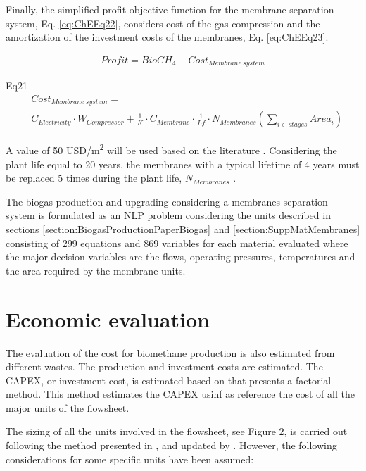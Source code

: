 \begin{refsection}[referencesCh7]
Finally, the simplified profit objective function for the membrane separation system, Eq. \ref{eq:ChEEq22}, considers cost of the gas compression and the amortization of the investment costs of the membranes, Eq. \ref{eq:ChEEq23}. 

\begin{align}
Profit = BioCH_{4} - Cost_{{{Membrane \ system}}} \label{eq:ChEEq22}
\end{align}

Eq21
\begin{align}
& Cost_{{{Membrane \ system}}} = \nonumber \\
& {{{C}}_{Electricity}}\cdot W_{Compressor} + \frac{1}{K}\cdot{C_{Membrane}}\cdot\frac{1}{{Lf}}\cdot{N_{Membranes}}(\sum\limits_{i \in stages} {Are{a_i}} ) \label{eq:ChEEq23}
\end{align}

A value of 50 USD/m\textsuperscript{2} will be used based on the literature \citep{kim2017optimization}. Considering the plant life equal to 20 years, the membranes with a typical lifetime of 4 years must be replaced 5 times during the plant life, $N_{Membranes}$ \citep{scholz2015structural}.

The biogas production and upgrading considering a membranes separation system is formulated as an NLP problem considering the units described in sections \ref{section:BiogasProductionPaperBiogas} and \ref{section:SuppMatMembranes} consisting of 299 equations and 869 variables for each material evaluated where the major decision variables are the flows, operating pressures, temperatures and the area required by the membrane units.

\section{Economic evaluation} \label{section:SuppMatPaperCO2Section3}
The evaluation of the cost for biomethane production is also estimated from different wastes. The production and investment costs are estimated. The CAPEX, or investment cost, is estimated based on \citet{towler2009chemical} that presents a factorial method. This method estimates the CAPEX usinf as reference the cost of all the major units of the flowsheet. 

The sizing of all the units involved in the flowsheet, see Figure 2, is carried out following the method presented in \citet{martin2011energy}, and updated by \citet{almena2016technoeconomic}. However, the following considerations for some specific units have been assumed:


\end{refsection}
